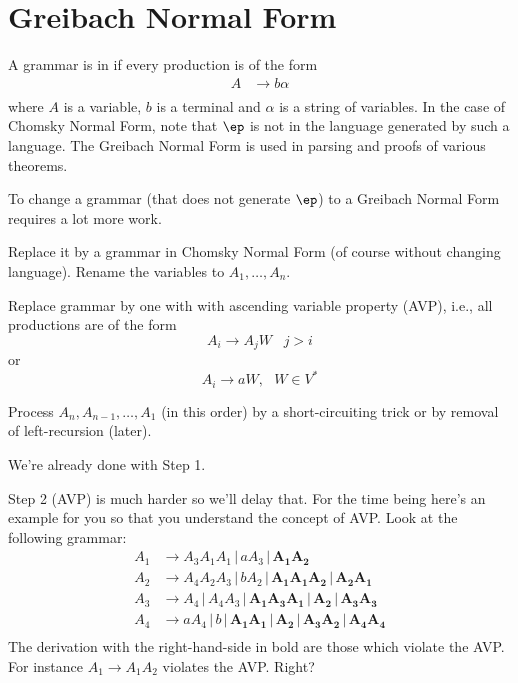 \section{Greibach Normal Form}

A grammar is in  if every production
is of the form
\begin{align*}
 A &\rightarrow b\alpha\\
\end{align*}
where $A$ is a variable, $b$ is a terminal and $\alpha$ is a
string of variables. In the case of Chomsky Normal Form, note that
$\ep$ is not in the language generated by such a language. The
Greibach Normal Form is used in parsing and proofs of various
theorems.

To change a grammar (that does not generate $\ep$) to a Greibach
Normal Form requires a lot more work.
\begin{mylist}
 \item Replace it by a grammar in Chomsky Normal Form (of course
 without changing language). Rename the variables to $A_1, \ldots,
 A_n$.
 \item Replace grammar by one with with ascending variable property
 (AVP), i.e., all productions are of the form
  \[ A_i \rightarrow A_jW \,\,\,\,\, j>i \]
  or
  \[ A_i \rightarrow aW , \,\,\,\, W \in V^*\]
 \item Process $A_n, A_{n - 1}, \ldots, A_1$ (in this order) by a short-circuiting trick
 or by removal of left-recursion (later).
\end{mylist}
We're already done with Step 1.

Step 2 (AVP) is much harder so we'll delay that. For the time
being here's an example for you so that you understand the concept
of AVP. Look at the following grammar:
\begin{align*}
 A_1 &\rightarrow A_3A_1A_1 \,|\, aA_3 \,|\, \mathbf{A_1A_2} \\
 A_2 &\rightarrow A_4A_2A_3 \,|\, bA_2 \,|\, \mathbf{A_1A_1A_2} \,|\,
 \mathbf{A_2A_1} \\
 A_3 &\rightarrow A_4 \,|\, A_4 A_3 \,|\, \mathbf{A_1A_3A_1} \,|\,
 \mathbf{A_2}
 \,|\, \mathbf{A_3A_3} \\
 A_4 &\rightarrow aA_4 \,|\, b \,|\, \mathbf{A_1A_1} \,|\, \mathbf{A_2} \,|\,
 \mathbf{A_3A_2}
 \,|\, \mathbf{A_4A_4} \\
\end{align*}
The derivation with the right-hand-side in bold are those which
violate the AVP. For instance $A_1 \rightarrow A_1A_2$ violates
the AVP. Right?

